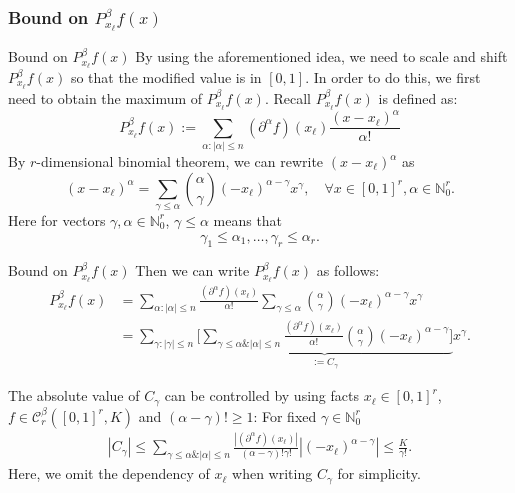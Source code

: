 \documentclass{if-beamer}
\begin{document}
\subsubsection{Bound on $P^{\beta}_{x_{\ell}}f(x)$}
\begin{frame}{Bound on $P^{\beta}_{x_{\ell}}f(x)$}
    By using the aforementioned idea, we need to scale and shift $P^{\beta}_{x_{\ell}}f(x)$ so that the modified value is in $[0,1]$. In order to do this, we first need to obtain the maximum of $P^{\beta}_{x_{\ell}}f(x)$.
    Recall $P^{\beta}_{x_{\ell}}f(x)$ is defined as: 
     \begin{equation*}
        P_{x_{\ell}}^{\beta}f(x):=\sum_{\alpha:|\alpha|\leq n}(\partial^{\alpha}f)(x_{\ell})\frac{(x-x_{\ell})^{\alpha}}{\alpha!}
    \end{equation*}
    By $r$-dimensional binomial theorem, we can rewrite $(x-x_{\ell})^{\alpha}$ as 
    \begin{equation*}
        (x-x_{\ell})^{\alpha}=\sum_{\gamma \leq \alpha} {\alpha \choose \gamma} (-x_{\ell})^{\alpha-\gamma}x^{\gamma}, \quad
        \forall x \in [0,1]^{r}, \alpha \in \mathbb{N}_{0}^{r}.  
    \end{equation*}
    Here for vectors $\gamma,\alpha \in \mathbb{N}_{0}^{r}$, $\gamma \leq \alpha$ means that 
    \begin{equation*}
        \gamma_{1}\leq\alpha_{1},\dots,\gamma_{r}\leq\alpha_{r}.
    \end{equation*}
\end{frame}

\begin{frame}{Bound on $P^{\beta}_{x_{\ell}}f(x)$}
    Then we can write $P^{\beta}_{x_{\ell}}f(x)$ as follows:
    \begin{align*}
        P_{x_{\ell}}^{\beta}f(x)&=\sum_{\alpha:|\alpha|\leq n}\frac{(\partial^{\alpha}f)(x_{\ell})}{\alpha!}
        \sum_{\gamma \leq \alpha} {\alpha \choose \gamma} (-x_{\ell})^{\alpha-\gamma}x^{\gamma}\\
        &=\sum_{\gamma:|\gamma|\leq n}
        \underbrace{\Bigg[\sum_{\gamma \leq \alpha \& |\alpha| \leq n} \frac{(\partial^{\alpha}f)(x_{\ell})}{\alpha!}{\alpha \choose \gamma} (-x_{\ell})^{\alpha-\gamma}\Bigg]}_{:=C_{\gamma}}x^{\gamma}.
    \end{align*}
    
    The absolute value of $C_{\gamma}$ can be controlled by using facts $x_{\ell}\in[0,1]^{r}$, $f\in\mathcal{C}_{r}^{\beta}([0,1]^{r},K)$ and $(\alpha-\gamma)!\geq 1$:
    For fixed $\gamma\in \mathbb{N}_{0}^{r}$
    \begin{align*}
        \left|C_{\gamma}\right| \leq \sum_{\gamma \leq \alpha \& |\alpha| \leq n} \frac{|(\partial^{\alpha}f)(x_{\ell})|}{(\alpha-\gamma)!\gamma!}|(-x_{\ell})^{\alpha-\gamma}|
        \leq \frac{K}{\gamma!}.
    \end{align*}
    Here, we omit the dependency of $x_{\ell}$ when writing $C_{\gamma}$ for simplicity.
\end{frame}
\end{document}

